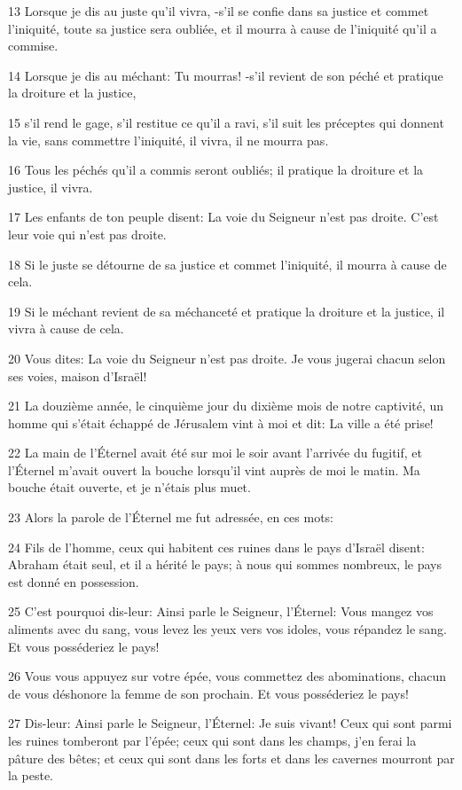 \par 13 Lorsque je dis au juste qu'il vivra, -s'il se confie dans sa justice et commet l'iniquité, toute sa justice sera oubliée, et il mourra à cause de l'iniquité qu'il a commise.
\par 14 Lorsque je dis au méchant: Tu mourras! -s'il revient de son péché et pratique la droiture et la justice,
\par 15 s'il rend le gage, s'il restitue ce qu'il a ravi, s'il suit les préceptes qui donnent la vie, sans commettre l'iniquité, il vivra, il ne mourra pas.
\par 16 Tous les péchés qu'il a commis seront oubliés; il pratique la droiture et la justice, il vivra.
\par 17 Les enfants de ton peuple disent: La voie du Seigneur n'est pas droite. C'est leur voie qui n'est pas droite.
\par 18 Si le juste se détourne de sa justice et commet l'iniquité, il mourra à cause de cela.
\par 19 Si le méchant revient de sa méchanceté et pratique la droiture et la justice, il vivra à cause de cela.
\par 20 Vous dites: La voie du Seigneur n'est pas droite. Je vous jugerai chacun selon ses voies, maison d'Israël!
\par 21 La douzième année, le cinquième jour du dixième mois de notre captivité, un homme qui s'était échappé de Jérusalem vint à moi et dit: La ville a été prise!
\par 22 La main de l'Éternel avait été sur moi le soir avant l'arrivée du fugitif, et l'Éternel m'avait ouvert la bouche lorsqu'il vint auprès de moi le matin. Ma bouche était ouverte, et je n'étais plus muet.
\par 23 Alors la parole de l'Éternel me fut adressée, en ces mots:
\par 24 Fils de l'homme, ceux qui habitent ces ruines dans le pays d'Israël disent: Abraham était seul, et il a hérité le pays; à nous qui sommes nombreux, le pays est donné en possession.
\par 25 C'est pourquoi dis-leur: Ainsi parle le Seigneur, l'Éternel: Vous mangez vos aliments avec du sang, vous levez les yeux vers vos idoles, vous répandez le sang. Et vous posséderiez le pays!
\par 26 Vous vous appuyez sur votre épée, vous commettez des abominations, chacun de vous déshonore la femme de son prochain. Et vous posséderiez le pays!
\par 27 Dis-leur: Ainsi parle le Seigneur, l'Éternel: Je suis vivant! Ceux qui sont parmi les ruines tomberont par l'épée; ceux qui sont dans les champs, j'en ferai la pâture des bêtes; et ceux qui sont dans les forts et dans les cavernes mourront par la peste.

